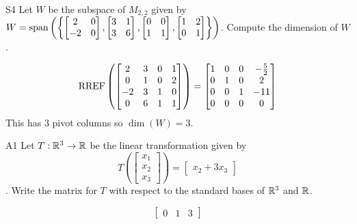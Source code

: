 \documentclass{sbgLAquiz}
\begin{document}
\begin{extract}\newpage\end{extract}
\begin{problem}{S4}  
Let $W$ be the subspace of $M_{2,2}$ given by $W={\rm span}\left(\left\{\begin{bmatrix} 2 & 0 \\ -2 & 0 \end{bmatrix}, \begin{bmatrix} 3 & 1 \\ 3 & 6 \end{bmatrix}, \begin{bmatrix} 0 & 0 \\ 1 & 1 \end{bmatrix}, \begin{bmatrix}1 & 2 \\ 0 & 1 \end{bmatrix}\right\}\right)$. Compute the dimension of $W$.
\end{problem}
\begin{solution}
$$\operatorname{RREF}\left( \begin{bmatrix} 2 & 3 & 0 & 1 \\ 0 & 1 & 0 & 2 \\ -2 & 3 & 1 & 0 \\ 0 & 6 & 1 & 1\end{bmatrix} \right) = \begin{bmatrix}1 & 0 & 0 & -\frac{5}{2} \\ 0 & 1 & 0 & 2 \\ 0 & 0 & 1 & -11\\ 0 & 0 & 0 & 0  \end{bmatrix} $$
This has 3 pivot columns so  $\dim(W) =3$.
\end{solution}
\begin{problem}{A1}
Let $T: \mathbb{R}^3 \rightarrow \mathbb{R}$ be the linear transformation given by $$T\left(\begin{bmatrix} x_1 \\ x_2 \\ x_3  \end{bmatrix} \right) = \begin{bmatrix} x_2+3x_3 \end{bmatrix}$$. Write the matrix for $T$ with respect to the standard bases of $\mathbb{R}^3$ and $\mathbb{R}$.
\end{problem}
\begin{solution}
$$\begin{bmatrix} 0 & 1 & 3 \end{bmatrix}$$
\end{solution}
\end{document}
